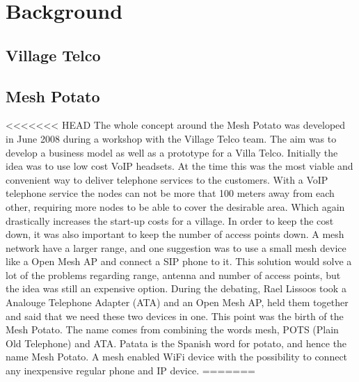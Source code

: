 \chapter{Background}
\label{chp:background} 

\section{Village Telco}

\section{Mesh Potato}



<<<<<<< HEAD
The whole concept around the Mesh Potato was developed in June 2008 during a workshop with the Village Telco team. The aim was to develop a business model as well as a prototype for a Villa Telco. Initially the idea was to use low cost VoIP headsets. At the time this was the most viable and convenient way to deliver telephone services to the customers. With a VoIP telephone service the nodes can not be more that 100 meters away from each other, requiring more nodes to be able to cover the desirable area. Which again drastically increases the start-up costs for a village. In order to keep the cost down, it was also important to keep the number of access points down. A mesh network have a larger range, and one suggestion was to use a small mesh device like a Open Mesh AP and connect a SIP phone to it. This solution would solve a lot of the problems regarding range, antenna and number of access points, but the idea was still an expensive option. During the debating, Rael Lissoos took a Analouge Telephone Adapter (ATA) and an Open Mesh AP, held them together and said that we need these two devices in one. This point was the birth of the Mesh Potato. The name comes from combining the words mesh, POTS (Plain Old Telephone) and ATA. Patata is the Spanish word for potato, and hence the name Mesh Potato. A mesh enabled WiFi device with the possibility to connect any inexpensive regular phone and IP device. \cite{MPorigin}
=======
